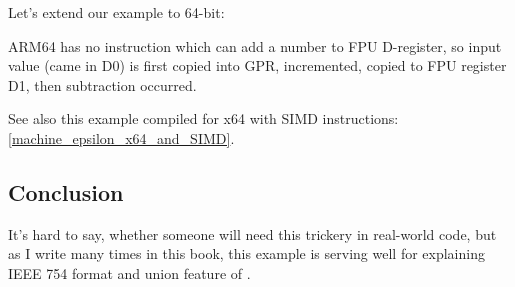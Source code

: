 Let's extend our example to 64-bit:



ARM64 has no instruction which can add a number to FPU D-register, 
so input value (came in D0) is first copied into GPR,
incremented, copied to FPU register D1, then subtraction occurred.



See also this example compiled for x64 with SIMD instructions: \ref{machine_epsilon_x64_and_SIMD}.
\fi

\subsection{Conclusion}

It's hard to say, whether someone will need this trickery in real-world code, 
but as I write many times in this book, this example is serving well 
for explaining IEEE 754 format and union feature of \CCpp.
\fi
